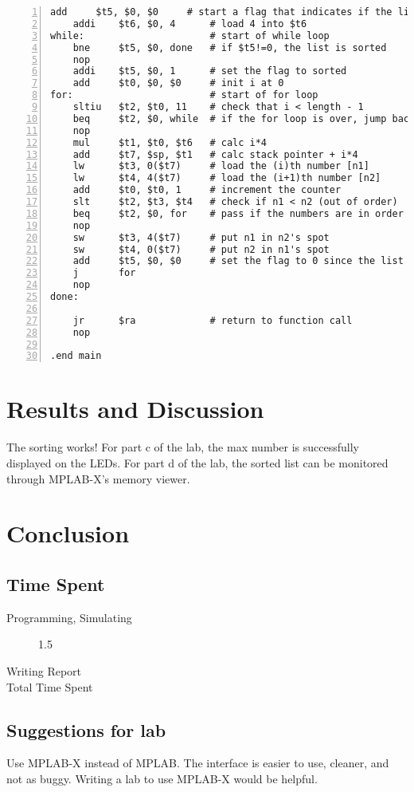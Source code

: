\documentclass[11pt]{article}
\begin{document}
\begin{lstlisting}[numbers=left,basicstyle=\footnotesize]
    add     $t5, $0, $0     # start a flag that indicates if the list is sorted.
    addi    $t6, $0, 4      # load 4 into $t6
while:                      # start of while loop
    bne     $t5, $0, done   # if $t5!=0, the list is sorted
    nop
    addi    $t5, $0, 1      # set the flag to sorted
    add     $t0, $0, $0     # init i at 0 
for:                        # start of for loop
    sltiu   $t2, $t0, 11    # check that i < length - 1
    beq     $t2, $0, while  # if the for loop is over, jump back to the while loop
    nop
    mul     $t1, $t0, $t6   # calc i*4
    add     $t7, $sp, $t1   # calc stack pointer + i*4
    lw      $t3, 0($t7)     # load the (i)th number [n1]
    lw      $t4, 4($t7)     # load the (i+1)th number [n2]
    add     $t0, $t0, 1     # increment the counter
    slt     $t2, $t3, $t4   # check if n1 < n2 (out of order)
    beq     $t2, $0, for    # pass if the numbers are in order ($t2=0)
    nop
    sw      $t3, 4($t7)     # put n1 in n2's spot
    sw      $t4, 0($t7)     # put n2 in n1's spot
    add     $t5, $0, $0     # set the flag to 0 since the list is not sorted
    j       for
    nop
done:
    
    jr      $ra             # return to function call
    nop

.end main
\end{lstlisting}


\section{Results and Discussion}

The sorting works! For part c of the lab, the max number is successfully displayed on the LEDs. For part d of the lab, the sorted list can be monitored through MPLAB-X's memory viewer.


\section{Conclusion}

\subsection{Time Spent}

\begin{description}
	\item[Programming, Simulating] 1.5
	\item[Writing Report]
	\item[Total Time Spent] 
\end{description}

\subsection{Suggestions for lab}

Use MPLAB-X instead of MPLAB. The interface is easier to use, cleaner, and not as buggy. Writing a lab to use MPLAB-X would be helpful.
\end{document}
